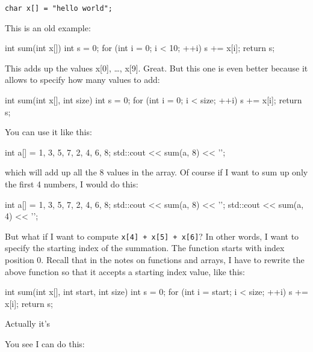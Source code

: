 \verb!char x[] = "hello world";!


\newpage{}

This is an old example:

\begin{consolethree}[escapeinside=||]
int sum(int x[])
{
    int s = 0;
    for (int i = 0; i < 10; ++i)
    {
        s += x[i];
    }
    return s;
}
\end{consolethree}

This adds up the values x[0], \ldots, x[9]. Great. But this one is even better because it allows to specify how many values to add:

\begin{consolethree}[escapeinside=||]
int sum(int x[], int size)
{
    int s = 0;
    for (int i = 0; i < size; ++i)
    {
        s += x[i];
    }
    return s;
}
\end{consolethree}

You can use it like this:

\begin{consolethree}[escapeinside=||]
int a[] = {1, 3, 5, 7, 2, 4, 6, 8};
std::cout << sum(a, 8) << '\n';
\end{consolethree}

which will add up all the 8 values in the array. Of course if I want to sum up only the first 4 numbers, I would do this:

\begin{consolethree}[escapeinside=||]
int a[] = {1, 3, 5, 7, 2, 4, 6, 8};
std::cout << sum(a, 8) << '\n';
std::cout << sum(a, 4) << '\n';
\end{consolethree}

But what if I want to compute \texttt{x[4] + x[5] + x[6]}? In other words, I want to specify the starting index of the summation. The function starts with index position 0. Recall that in the notes on functions and arrays, I have to rewrite the above function so that it accepts a starting index value, like this:

\begin{consolethree}[escapeinside=||]
int sum(int x[], int start, int size)
{
    int s = 0;
    for (int i = start; i < size; ++i)
    {
        s += x[i];
    }
    return s;
}
\end{consolethree}

Actually it's 

You see I can do this:

